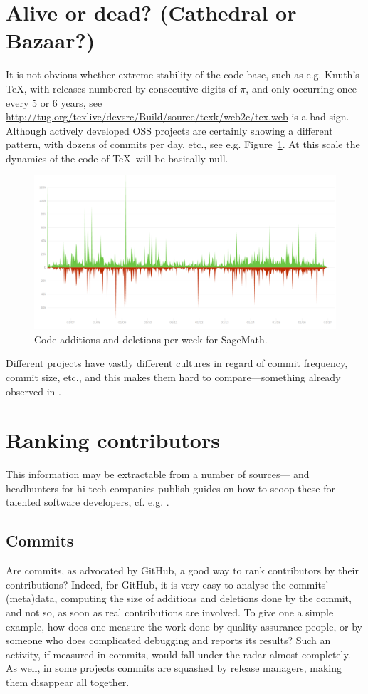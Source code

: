 \documentclass{deliverablereport}
\begin{document}
\section{Alive or dead? (Cathedral or Bazaar?)}
It is not obvious whether extreme stability of the code base,
such as e.g. Knuth's \TeX \cite{Knuth:ttb84}, with releases
numbered by consecutive digits of $\pi$, and only occurring
once every 5 or 6 years, see
\url{http://tug.org/texlive/devsrc/Build/source/texk/web2c/tex.web}
is a bad sign.
Although actively developed OSS projects are certainly showing 
a different pattern, with dozens of commits per day, etc., see
e.g. Figure~\ref{wp7:figsageadddel}. At this scale the dynamics of
the code of \TeX\ will be basically null.
\begin{figure}[ht]
  \includegraphics[width=\textwidth]{codeadddel}
    \caption{Code additions and deletions per week for 
    SageMath.\label{wp7:figsageadddel}}
\end{figure}
Different projects have vastly different cultures in regard of
commit frequency, commit size, etc., and this makes them 
hard to compare---something already observed in 
 \cite{raymond99:cathedral-bazaar}. 


\section{Ranking contributors}
This information may be extractable from a number of sources---
and headhunters for hi-tech companies publish guides on
how to scoop these for talented software developers, cf.
e.g. \cite{wp7:sota}.

\subsection{Commits}
Are commits, as advocated by GitHub, a good way to rank contributors by their
contributions? Indeed, for GitHub, it is very easy to analyse the commits' (meta)data, computing the size of additions and deletions done by the commit,
and not so, as soon as real contributions are involved. To give one a simple example, how does
one measure the work done by quality assurance people, or by someone who does complicated debugging
and reports its results? Such an activity, if measured in commits, would fall under the radar almost
completely. As well, in some projects commits are squashed by release
managers, making them disappear all together.
\end{document}
